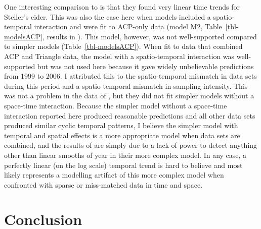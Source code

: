 \documentclass[
  10pt,
  letterpaper,
]{article}
\begin{document}
One interesting comparison to \citep{amundson2019} is that they found
very linear time trends for Steller's eider. This was also the case here
when models included a spatio-temporal interaction and were fit to
ACP-only data (model M2, Table~\ref{tbl-modelsACP}, results in
). This model, however, was not well-supported
compared to simpler models (Table~\ref{tbl-modelsACP}). When fit to data
that combined ACP and Triangle data, the model with a spatio-temporal
interaction was well-supported but was not used here because it gave
widely unbelievable predictions from 1999 to 2006. I attributed this to
the spatio-temporal mismatch in data sets during this period and a
spatio-temporal mismatch in sampling intensity. This was not a problem
in the data of \citep{amundson2019}, but they did not fit simpler models
without a space-time interaction. Because the simpler model without a
space-time interaction reported here produced reasonable predictions and
all other data sets produced similar cyclic temporal patterns, I believe
the simpler model with temporal and spatial effects is a more
appropriate model when data sets are combined, and the results of
\citep{amundson2019} are simply due to a lack of power to detect
anything other than linear smooths of year in their more complex model.
In any case, a perfectly linear (on the log scale) temporal trend is
hard to believe and most likely represents a modelling artifact of this
more complex model when confronted with sparse or miss-matched data in
time and space.

\section{Conclusion}\label{conclusion}
\end{document}
